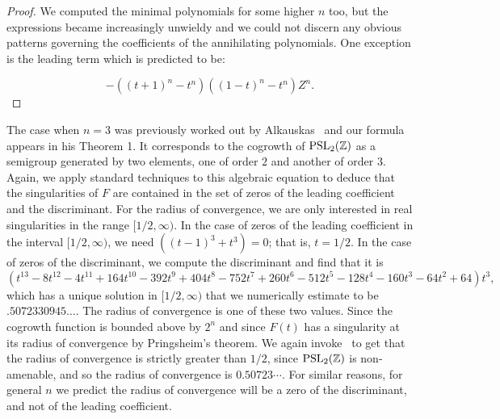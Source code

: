 \documentclass[11pt]{amsart}
\theoremstyle{definition}
\begin{document}
\begin{proof}
We computed the minimal polynomials for some higher $n$ too, but the expressions became increasingly unwieldy and we could not discern any obvious patterns governing the coefficients of the annihilating polynomials. One exception is the leading term which is predicted to be:

\begin{equation}
-\left((t+1)^n-t^n\right)\left((1-t)^n-t^n\right) Z^n. \end{equation}

\end{proof}
The case when $n=3$ was previously worked out by Alkauskas~\cite{alkauskas} and our formula appears in his Theorem 1. It corresponds to the cogrowth of ${\rm PSL}_2(\mathbb{Z})$ as a semigroup generated by two elements, one of order $2$ and another of order $3$.  Again, we apply standard techniques to this algebraic equation to deduce that the singularities of $F$ are contained in the set of zeros of the leading coefficient and the discriminant. For the radius of convergence, we are only interested in real singularities in the range $[1/2,\infty)$. In the case of zeros of the leading coefficient in the interval $[1/2,\infty)$, we need $((t-1)^3+t^3)=0$; that is, $t=1/2$. In the case of zeros of the discriminant, we compute the discriminant and find that it is
{\small
\[ \left( t^{13}-8t^{12}-4t^{11}+164t^{10}-392t^{9}+ 404{t}^{8}-752{t}^{7}+260{t}^{6}-512{t}^{5}-128{t}^{4}-160t^{3}-64{t}^{2}+64 \right) {t}^{3},\]}
which has a unique solution in $[1/2,\infty)$ that we numerically estimate to be~$.5072330945\ldots$. The radius of convergence is one of these two values. Since the cogrowth function is bounded above by $2^n$ and since $F(t)$ has a singularity at its radius of convergence by Pringsheim's theorem.  We again invoke~\cite[Corollary 6.6]{Kam} to get that the radius of convergence is strictly greater than $1/2$, since ${\rm PSL}_2(\mathbb{Z})$ is non-amenable, and so the radius of convergence is $0.50723\cdots$. For similar reasons, for general $n$ we predict the radius of convergence will be a zero of the discriminant, and not of the leading coefficient. 
\end{document}
